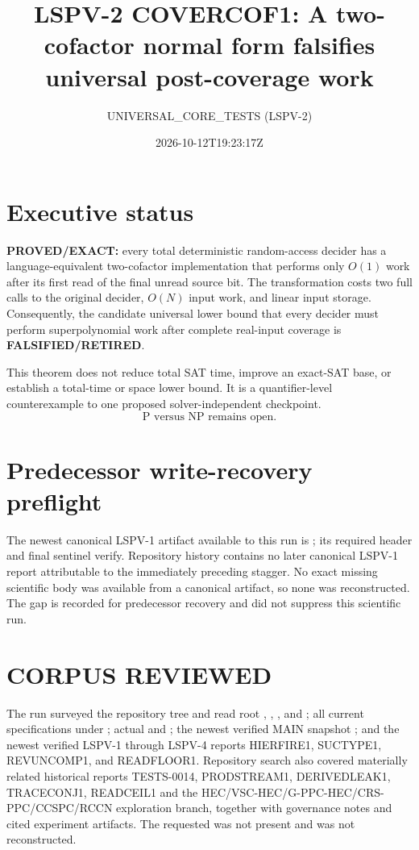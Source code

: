 \documentclass[11pt]{article}
\title{LSPV-2 COVERCOF1: A two-cofactor normal form falsifies universal post-coverage work}
\author{UNIVERSAL\_CORE\_TESTS (LSPV-2)}
\date{2026-10-12T19:23:17Z}
\newcommand{\Status}[1]{\textbf{#1}}
\begin{document}
\maketitle

\section*{Executive status}
\Status{PROVED/EXACT:} every total deterministic random-access decider has a
language-equivalent two-cofactor implementation that performs only \(O(1)\)
work after its first read of the final unread source bit. The transformation
costs two full calls to the original decider, \(O(N)\) input work, and linear
input storage. Consequently, the candidate universal lower bound that every
decider must perform superpolynomial work after complete real-input coverage
is \Status{FALSIFIED/RETIRED}.

This theorem does not reduce total SAT time, improve an exact-SAT base, or
establish a total-time or space lower bound. It is a quantifier-level
counterexample to one proposed solver-independent checkpoint.
\[
 \boxed{\text{P versus NP remains open.}}
\]

\section{Predecessor write-recovery preflight}
The newest canonical LSPV-1 artifact available to this run is
;
its required header and final sentinel verify. Repository history contains no
later canonical LSPV-1 report attributable to the immediately preceding
stagger. No exact missing scientific body was available from a canonical
artifact, so none was reconstructed. The gap is recorded for predecessor
recovery and did not suppress this scientific run.

\section{CORPUS REVIEWED}
The run surveyed the repository tree and read root ,
, , and
; all current specifications under
; actual  and ; the newest verified
MAIN snapshot ; and
the newest verified LSPV-1 through LSPV-4 reports HIERFIRE1, SUCTYPE1,
REVUNCOMP1, and READFLOOR1. Repository search also covered materially related
historical reports TESTS-0014, PRODSTREAM1, DERIVEDLEAK1, TRACECONJ1,
READCEIL1 and the HEC/VSC-HEC/G-PPC-HEC/CRS-PPC/CCSPC/RCCN exploration
branch, together with governance notes and cited experiment artifacts. The
requested  was not present and was not
reconstructed.
\end{document}

